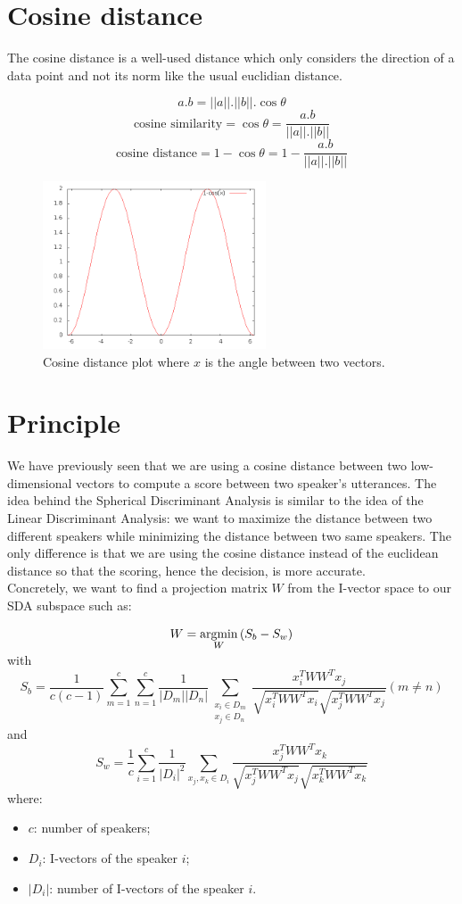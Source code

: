 \documentclass{techrep} %
\begin{document}
\section{Cosine distance}

The cosine distance is a well-used distance which only considers the
direction of a data point and not its norm like the usual euclidian distance.

$$a.b = ||a||.||b||. \cos{\theta}$$
$$\text{cosine similarity} = \cos{\theta} = \frac{a.b}{||a||.||b||}$$
$$\text{cosine distance} = 1 - \cos{\theta} = 1 - \frac{a.b}{||a||.||b||}$$

\begin{figure}[H]
  \centering
  \includegraphics[width=250px]{cosine_distance}
  \caption{Cosine distance plot where $x$ is the angle between two
    vectors.}
  \label{cosine_distance}
\end{figure}

\section{Principle}

We have previously seen that we are using a cosine distance between
two low-dimensional vectors to compute a score between two speaker's
utterances. The idea behind the Spherical Discriminant Analysis is
similar to the idea of the Linear Discriminant Analysis: we want to
maximize the distance between two different speakers while minimizing
the distance between two same speakers. The only difference is that we
are using the cosine distance instead of the euclidean distance so
that the scoring, hence the decision, is more accurate.\\ Concretely,
we want to find a projection matrix $W$ from the I-vector space to our
SDA subspace such as:

$$W = \smash{\mathop{{\rm argmin}}\limits_{W}}\, (S_b - S_w)$$
with
$$S_b =
\frac{1}{c(c-1)}\sum_{m=1}^c\sum_{n=1}^c\frac{1}{|D_m||D_n|}\sum_{\substack{x_i
    \in D_m \\ x_j \in D_n}}
\frac{x_i^TWW^Tx_j}{\sqrt{x_i^TWW^Tx_i}\sqrt{x_j^TWW^Tx_j}} (m \neq
n)$$ and
$$S_w = \frac{1}{c}\sum_{i=1}^c\frac{1}{|D_i|^2}\sum_{x_j,x_k \in D_i}
\frac{x_j^TWW^Tx_k}{\sqrt{x_j^TWW^Tx_j}\sqrt{x_k^TWW^Tx_k}}$$
where:
\begin{itemize}
  \item $c$: number of speakers;
  \item $D_i$: I-vectors of the speaker $i$;
  \item $|D_i|$: number of I-vectors of the speaker $i$.
\end{itemize}
\end{document}
